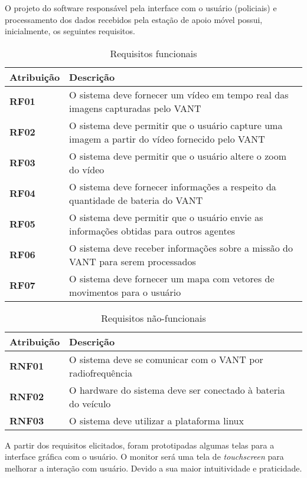 O projeto do software responsável pela interface com o usuário (policiais) e processamento dos dados recebidos pela estação de apoio móvel possui, inicialmente, os seguintes requisitos.

\begin{table}[H]
\centering
\begin{tabular}{ | p{3cm} | p{9cm}| }
\hline
\textbf{Atribuição} & \textbf{Descrição} \\ \hline
\textbf{RF01} & O sistema deve fornecer um vídeo em tempo real das imagens capturadas pelo VANT \\ \hline
\textbf{RF02} & O sistema deve permitir que o usuário capture uma imagem a partir do vídeo fornecido pelo VANT \\ \hline
\textbf{RF03} & O sistema deve permitir que o usuário altere o zoom do vídeo \\ \hline
\textbf{RF04} & O sistema deve fornecer informações a respeito da quantidade de bateria do VANT \\ \hline
\textbf{RF05} & O sistema deve permitir que o usuário envie as informações obtidas para outros agentes \\ \hline
\textbf{RF06} & O sistema deve receber informações sobre a missão do VANT para serem processados \\ \hline
\textbf{RF07} & O sistema deve fornecer um mapa com vetores de movimentos para o usuário \\ \hline
\end{tabular}
\caption{Requisitos funcionais}
\end{table}

\begin{table}[H]
\centering
\begin{tabular}{ | p{3cm} | p{9cm}| }
\hline
\textbf{Atribuição} & \textbf{Descrição} \\ \hline
\textbf{RNF01} & O sistema deve se comunicar com o VANT por radiofrequência \\ \hline
\textbf{RNF02} & O hardware do sistema deve ser conectado à bateria do veículo \\ \hline
\textbf{RNF03} & O sistema deve utilizar a plataforma linux \\ \hline
\end{tabular}
\caption{Requisitos não-funcionais}
\end{table}

A partir dos requisitos elicitados, foram prototipadas algumas telas para a interface gráfica com o usuário. O monitor será uma tela de \textit{touchscreen} para melhorar a interação com usuário. Devido a sua maior intuitividade e praticidade.

